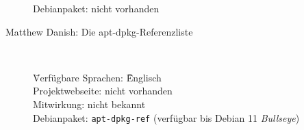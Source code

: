 \documentclass[10pt]{article}
\begin{document}
\begin{description}
\begin{tabbing}
            \> Debianpaket: \> \> nicht vorhanden \\
        \end{tabbing}
        
    \item[Matthew Danish: Die apt-dpkg-Referenzliste] ~ \\
        \begin{tabbing}
            \= Verfügbare Sprachen: \= \= Englisch \\
            \> Projektwebseite: \> \> nicht vorhanden \\
            \> Mitwirkung: \> \> nicht bekannt \\
            
            \> Debianpaket: \> \> \texttt{apt-dpkg-ref} (verfügbar bis Debian 11 \textit{Bullseye})
        \end{tabbing}
\end{description}
\end{document}

